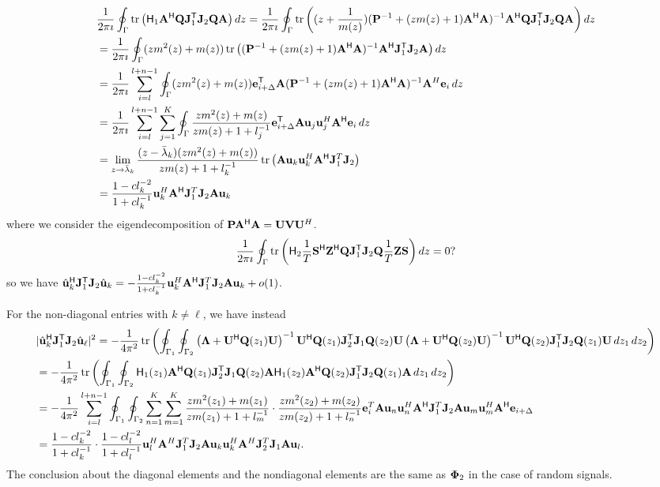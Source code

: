 \documentclass[11pt,a4paper]{article}
\begin{document}
\begin{align*}
    &\frac1{2 \pi \imath}  \oint_{\Gamma} \tr \left( \H_1 \A^\H \Q\J_1^\T \J_2 \Q \A \right) dz = \frac1{2 \pi \imath}  \oint_{\Gamma} \tr \left( (z+\frac{1}{m(z)})(\P^{-1} + (zm(z)+1)\A^ \H \A)^{-1} \A^\H \Q\J_1^\T \J_2 \Q \A \right) dz \\
    &= \frac1{2 \pi \imath}  \oint_{\Gamma} (zm^2(z)+m(z)) \tr \left( (\P^{-1} + (zm(z)+1)\A^ \H \A)^{-1} \A^\H \J_1^\T \J_2\A \right) dz \\
    &=  \frac1{2 \pi \imath} \sum_{i=l}^{l+n-1} \oint_{\Gamma} (zm^2(z)+m(z))  \ee_{i + \Delta}^\T \A (\P^{-1} + (zm(z)+1)\A^\H \A)^{-1} \A^H \ee_i \, dz \\
    &= \frac1{2 \pi \imath} \sum_{i=l}^{l+n-1} \sum_{j=1}^K \oint_{\Gamma} \frac{zm^2(z)+m(z)}{zm(z)+1+l_j^{-1}}  \ee_{i + \Delta}^\T \A \uu_j \uu_j^H \A^\H \ee_i \, dz \\
    &= \lim_{z \to \bar \lambda_k } \frac{(z-\bar \lambda_k)(zm^2(z)+m(z))}{zm(z)+1+l_k^{-1}} \tr \left( \A \uu_k \uu_k^H \A^\H \J_1^T \J_2 \right) \\
    &= \frac{1-c l_k^{-2}}{1+c l_k^{-1}} \uu_k^H \A^\H \J_1^T \J_2 \A \uu_k
\end{align*}
where we consider the eigendecomposition of $\P \A^{\H}\A = \U\V\U^H$.
\begin{align*}
    \frac1{2 \pi \imath}  \oint_{\Gamma} \tr \left(  \H_2 \frac1T \S^\H \Z^\H \Q \J_1^\T \J_2 \Q \frac1T \Z \S \right) dz = 0?
\end{align*}
so we have $\hat \uu_k^\H \J_1^\T \J_2 \hat \uu_k = - \frac{1-c l_k^{-2}}{1+c l_k^{-1}} \uu_k^H \A^\H \J_1^T \J_2 \A \uu_k +o(1)$.

For the non-diagonal entries with $k \neq \ell$, we have instead
\begin{align*}
    &|\hat \uu_k^\H \J_1^\T \J_2 \hat \uu_\ell|^2 = - \frac1{4 \pi^2} \tr \left( \oint_{\Gamma_1} \oint_{\Gamma_2} \left( \bLambda + \U^\H \Q(z_1) \U \right)^{-1} \U^\H \Q(z_1) \J_2^\T \J_1 \Q(z_2) \U \left( \bLambda + \U^\H \Q(z_2) \U \right)^{-1} \U^\H \Q(z_2) \J_1^\T \J_2 \Q(z_1) \U \,dz_1\,dz_2 \right) \\
    &= - \frac1{4 \pi^2} \tr \left( \oint_{\Gamma_1} \oint_{\Gamma_2} \H_1(z_1)  \A^\H \Q(z_1) \J_2^\T \J_1 \Q(z_2) \A \H_1(z_2)  \A^\H \Q(z_2) \J_1^\T \J_2 \Q(z_1) \A \,dz_1\,dz_2 \right) \\
    &= - \frac1{4 \pi^2} \sum_{i=l}^{l+n-1} \oint_{\Gamma_1} \oint_{\Gamma_2} \sum_{n=1}^K \sum_{m=1}^K \frac{zm^2(z_1)+m(z_1)}{zm(z_1)+1+l_m^{-1}} \cdot \frac{zm^2(z_2)+m(z_2)}{zm(z_2)+1+l_n^{-1}} \ee_i^T \A \uu_n \uu_n^H \A^\H \J_1^T \J_2 \A \uu_m \uu_m^H \A^\H \ee_{i+\Delta}  \\
    &= \frac{1- c l_k^{-2}}{ 1 + c l_k^{-1} } \cdot \frac{1- c l_l^{-2}}{ 1 + c l_l^{-1} }  \uu_l^H \A^H \J_1^T \J_2 \A \uu_k \uu_k^H \A^H \J_2^T \J_1 \A \uu_l.
\end{align*}
The conclusion about the diagonal elements and the nondiagonal elements are the same as $\bPhi_2$ in the case of random signals.
\end{document}

